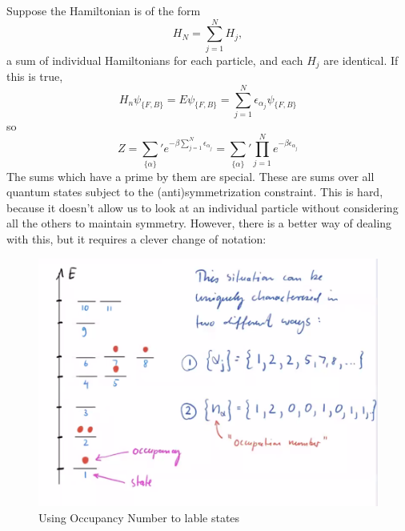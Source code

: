 \documentclass[a4paper,twoside,master.tex]{subfiles}
\begin{document}
Suppose the Hamiltonian is of the form
\begin{equation}
    H_N = \sum_{j=1}^{N} H_j,
\end{equation}
a sum of individual Hamiltonians for each particle, and each $ H_j $ are identical. If this is true,
\begin{equation}
    H_n \psi_{\{F,B\}} = E \psi_{\{F,B\}} = \sum_{j=1}^{N} \epsilon_{\alpha_j} \psi_{\{F,B\}}
\end{equation}
so
\begin{equation}
    Z = \sum_{\{\alpha\}}' e^{- \beta \sum_{j=1}^{N} \epsilon_{\alpha_j}} = \sum_{\{\alpha\}}' \prod_{j=1}^{N} e^{- \beta \epsilon_{\alpha_j}}
\end{equation}
The sums which have a prime by them are special. These are sums over all quantum states subject to the (anti)symmetrization constraint. This is hard, because it doesn't allow us to look at an individual particle without considering all the others to maintain symmetry. However, there is a better way of dealing with this, but it requires a clever change of notation:

\begin{figure}[h]
    \centering
    \includegraphics{figures/lec_34_occupancy.png}
    \caption{Using Occupancy Number to lable states}
    \label{fig:lec_34_occupancy}
\end{figure}
\end{document}
